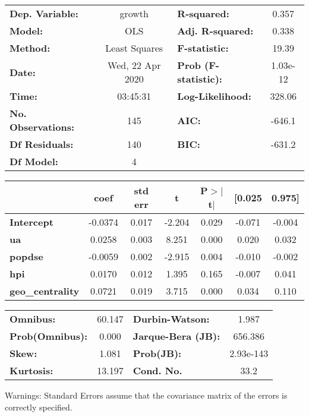 \begin{center}
\begin{tabular}{lclc}
\toprule
\textbf{Dep. Variable:}    &      growth      & \textbf{  R-squared:         } &     0.357   \\
\textbf{Model:}            &       OLS        & \textbf{  Adj. R-squared:    } &     0.338   \\
\textbf{Method:}           &  Least Squares   & \textbf{  F-statistic:       } &     19.39   \\
\textbf{Date:}             & Wed, 22 Apr 2020 & \textbf{  Prob (F-statistic):} &  1.03e-12   \\
\textbf{Time:}             &     03:45:31     & \textbf{  Log-Likelihood:    } &    328.06   \\
\textbf{No. Observations:} &         145      & \textbf{  AIC:               } &    -646.1   \\
\textbf{Df Residuals:}     &         140      & \textbf{  BIC:               } &    -631.2   \\
\textbf{Df Model:}         &           4      & \textbf{                     } &             \\
\bottomrule
\end{tabular}
\begin{tabular}{lcccccc}
                         & \textbf{coef} & \textbf{std err} & \textbf{t} & \textbf{P$> |$t$|$} & \textbf{[0.025} & \textbf{0.975]}  \\
\midrule
\textbf{Intercept}       &      -0.0374  &        0.017     &    -2.204  &         0.029        &       -0.071    &       -0.004     \\
\textbf{ua}              &       0.0258  &        0.003     &     8.251  &         0.000        &        0.020    &        0.032     \\
\textbf{popdse}          &      -0.0059  &        0.002     &    -2.915  &         0.004        &       -0.010    &       -0.002     \\
\textbf{hpi}             &       0.0170  &        0.012     &     1.395  &         0.165        &       -0.007    &        0.041     \\
\textbf{geo\_centrality} &       0.0721  &        0.019     &     3.715  &         0.000        &        0.034    &        0.110     \\
\bottomrule
\end{tabular}
\begin{tabular}{lclc}
\textbf{Omnibus:}       & 60.147 & \textbf{  Durbin-Watson:     } &     1.987  \\
\textbf{Prob(Omnibus):} &  0.000 & \textbf{  Jarque-Bera (JB):  } &   656.386  \\
\textbf{Skew:}          &  1.081 & \textbf{  Prob(JB):          } & 2.93e-143  \\
\textbf{Kurtosis:}      & 13.197 & \textbf{  Cond. No.          } &      33.2  \\
\bottomrule
\end{tabular}
\end{center}

Warnings: \newline
 [1] Standard Errors assume that the covariance matrix of the errors is correctly specified.